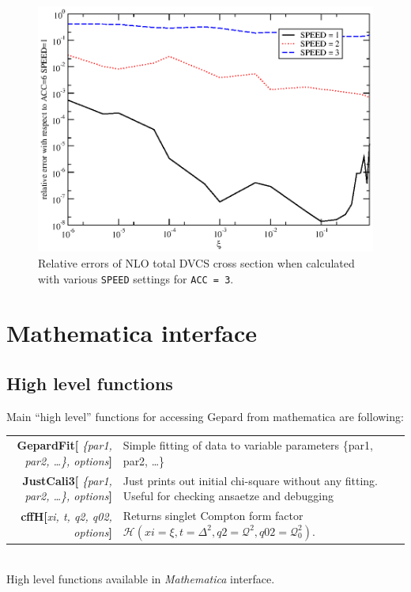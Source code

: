 \documentclass[12pt]{article}
\newcommand{\defboxitem}[3]{ {\ttfamily \bfseries #1[}\emph{#2}{\ttfamily \bfseries ]} & #3 }
\begin{document}
\begin{figure}
\begin{center}
\includegraphics[scale=0.8]{acc}
\end{center}
\caption{Relative errors of NLO total DVCS cross section when calculated with various
\texttt{SPEED} settings for \texttt{ACC = 3}.}
\label{fig:acc}
\end{figure}



\section{Mathematica interface}
\label{sec:mma}


\subsection{High level functions}

Main ``high level'' functions for accessing Gepard from mathematica are following:

\begin{flushleft}
\colorbox{defbox}{%
\begin{minipage}{\textwidth}%
\begin{tabular}{rp{8cm}}%
\defboxitem{GepardFit}{ \{par1, par2, \ldots\}, options}{Simple fitting of data to 
variable parameters \{par1, par2, \ldots\}} \\[0.8ex]
\defboxitem{JustCali3}{ \{par1, par2, \ldots\}, options}{Just prints out initial chi-square without
any fitting. Useful for checking ansaetze and debugging}\\[0.8ex]
\defboxitem{cffH}{xi, t, q2, q02, options}{Returns singlet Compton form factor
$\mathcal{H}(xi=\xi, t=\Delta^2, q2=\mathcal{Q}^2, q02=\mathcal{Q}_{0}^2)$.} 
\end{tabular}%
\end{minipage}}\\[0.5ex]
{\small High level functions available in \emph{Mathematica} interface.}
\end{flushleft}
\end{document}
